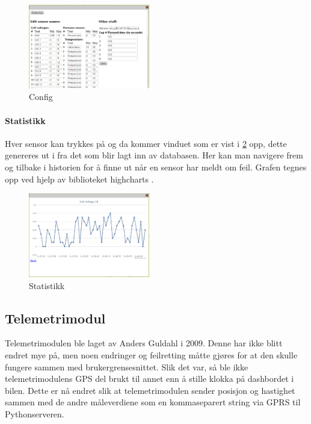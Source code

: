 \begin{figure}[H]
\includegraphics[width=200px]{images/config.png}
\caption{Config}
\label{fig:config}
\end{figure}

\paragraph{Statistikk}
Hver sensor kan trykkes på og da kommer vinduet som er vist i \ref{fig:stats} opp, dette genereres ut i fra det som blir lagt inn av databasen. Her kan man navigere frem og tilbake i historien for å finne ut når en sensor har meldt om feil. Grafen tegnes opp ved hjelp av biblioteket highcharts \cite{highcharts}.

\begin{figure}[H]
\includegraphics[width=200px]{images/stat.png}
\caption{Statistikk}
\label{fig:stats}
\end{figure}

\subsection{Telemetrimodul}
Telemetrimodulen ble laget av Anders Guldahl \cite{telemetrithesis} i 2009. Denne har ikke blitt endret mye på, men noen endringer og feilretting måtte gjøres for at den skulle fungere sammen med brukergrensesnittet.
Slik det var, så ble ikke telemetrimodulens GPS del brukt til annet enn å stille klokka på dashbordet i bilen. Dette er nå endret slik at telemetrimodulen sender posisjon og hastighet sammen med de andre måleverdiene som en kommaseparert string via GPRS til Pythonserveren.
